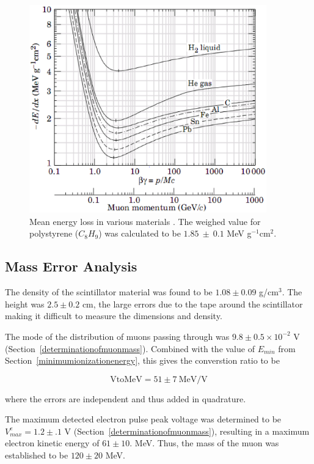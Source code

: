 \label{energy_loss}
\begin{figure}[h]
\begin{center}
\includegraphics[height = 90mm]{figures/energy_loss.eps}
\caption{\small{Mean energy loss in various materials \cite{yao}. The
weighed value for polystyrene ($C_8H_9$) was calculated to be
$1.85~\pm~0.1$ MeV g$^{-1}$cm$^{2}$}.}
\label{figure:dEdx}
\end{center}
\end{figure}

\subsection{Mass Error Analysis}

The density of the scintillator material was found to be $1.08 \pm
0.09$ g/cm$^3$. The height was $2.5 \pm 0.2$ cm, the large errors due
to the tape around the scintillator making it difficult to measure the
dimensions and density.

The mode of the distribution of muons passing through was $9.8 \pm 0.5
\times 10^{-2}$ V (Section~\ref{determinationofmuonmass}). Combined
with the value of $E_{min}$ from Section~\ref{minimumionizationenergy},
this gives the converstion ratio to be

\begin{equation} \mathrm{VtoMeV} = 51 \pm 7~\mathrm{ MeV/V} \end{equation}   

where the errors are independent and thus added in quadrature.

The maximum detected electron pulse peak voltage was determined to be
$V_{max}^e = 1.2 \pm .1$ V (Section~\ref{determinationofmuonmass}),
resulting in a maximum electron kinetic energy of $61\pm 10.$
MeV. Thus, the mass of the muon was established to be $120 \pm 20$
MeV.
